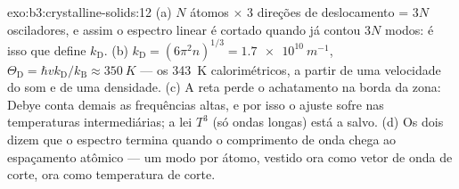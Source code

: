 \begin{solution}{exo:b3:crystalline-solids:12}
(a) $N$ átomos $\times$ 3 direções de deslocamento = $3N$
osciladores, e assim o espectro linear é cortado quando já
contou $3N$ modos: é isso que define $k_{\text{D}}$. (b)
$k_{\text{D}} = (6\pi^2n)^{1/3} = \qty{1.7e10}{m^{-1}}$,
$\Theta_{\text{D}} = \hbar vk_{\text{D}}/k_{\text{B}} \approx
\qty{350}{K}$ --- os \qty{343}{K} calorimétricos, a partir de uma
velocidade do som e de uma densidade. (c) A reta perde o achatamento
na borda da zona: Debye conta demais as frequências altas, e por isso o
ajuste sofre nas temperaturas intermediárias; a lei $T^3$ (só ondas
longas) está a salvo. (d) Os dois dizem que o espectro termina quando o
comprimento de onda chega ao espaçamento atômico --- um modo por átomo,
vestido ora como vetor de onda de corte, ora como temperatura de corte.
\end{solution}

